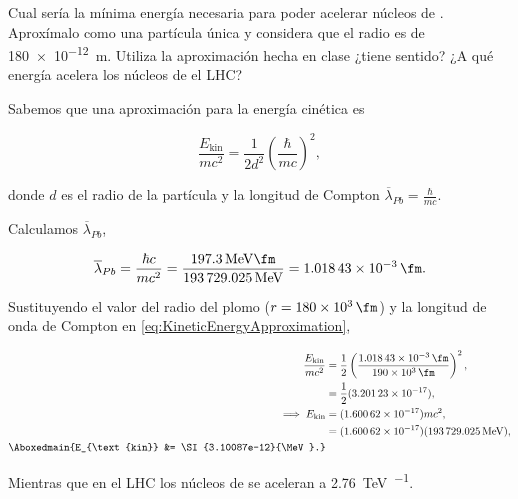 \documentclass[./../main.tex]{subfiles}
\begin{document}
	\begin{exercise}
		Cual sería la mínima energía necesaria para poder acelerar núcleos de . Aproxímalo como una partícula única y considera que el radio es de \SI{180e-12}{\m}. Utiliza la aproximación hecha en clase ¿tiene sentido? ¿A qué energía acelera los núcleos de  el LHC?

		\begin{solution}
			Sabemos que una aproximación para la energía cinética es

			\begin{equation*}
				\dfrac{E_{\text{kin}}}{mc^{2}} = \dfrac{1}{2d^{2}}\left(\dfrac{\hbar}{mc}\right)^{2},
				\label{eq:KineticEnergyApproximation}
			\end{equation*}

			donde \(d\) es el radio de la partícula y la longitud de Compton \(\overline{\lambda}_{Pb} = \tfrac{\hbar}{mc}\).

			Calculamos \(\overline{\lambda}_{Pb}\),

			\begin{equation*}
				\overline{\lambda}_{Pb} = \dfrac{\hbar c}{mc^{2}} = \dfrac{\SI{197.3}{\MeV\fm}}{\SI{193729.025}{\MeV}} = \SI{1.01843e-3}{\fm}.
			\end{equation*}

			Sustituyendo el valor del radio del plomo (\(r = \SI{180e3}{\fm}\)) y la longitud de onda de Compton en \cref{eq:KineticEnergyApproximation},

			\begin{align*}
				\dfrac{E_\text{kin}}{mc^{2}} &= \dfrac{1}{2}\left(\dfrac{\SI{1.01843e-3}{\fm}}{\SI{190e3}{\fm}}\right)^{2},\\
				&= \dfrac{1}{2}(\num{3.20123e-17}),\\
				\implies E_{\text{kin}} &= (\num{1.60062e-17})mc^{2},\\
				&= (\num{1.60062e-17})(\SI{193729.025}{\MeV}),\\
				\Aboxedmain{E_{\text{kin}} &= \SI{3.10087e-12}{\MeV}.}
			\end{align*}

			Mientras que en el LHC los núcleos de  se aceleran a \SI{2.76}{\TeV\per\nucleon}.
		\end{solution}
	\end{exercise}
\end{document}
